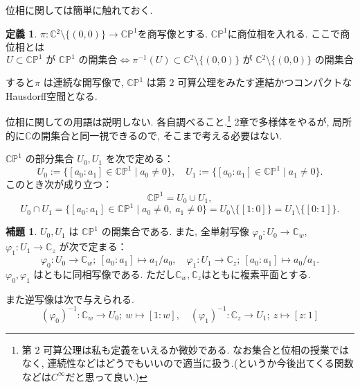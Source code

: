\documentclass[dvipdfmx,a4paper,11pt]{article} %
\newcommand{\C}{\mathbb{C}}
\theoremstyle{definition}
\numberwithin{equation}{section}
\newtheorem{lem}[thm]{補題}
\newtheorem{defn}[thm]{定義}
\begin{document}
位相に関しては簡単に触れておく. 

\begin{defn}
$\pi  : \C{}^2\setminus \{(0,0)\} \to \C\mathbb P^1$を商写像とする. 
$ \C\mathbb P^1$に商位相を入れる. 
ここで商位相とは
\[
U\subset \C\mathbb P^1\text{ が }\C\mathbb P^1\text{ の開集合}
\Longleftrightarrow
\pi^{-1}(U)\subset \C{}^2\setminus \{(0,0)\}\text{ が }\C{}^2\setminus \{(0,0)\}\text{ の開集合}
\]

すると$\pi$ は連続な開写像で, $\C\mathbb P^1$ は第 $2$ 可算公理をみたす連結かつコンパクトなHausdorff空間となる. 
\end{defn}
位相に関しての用語は説明しない. 各自調べること.\footnote{第 $2$ 可算公理は私も定義をいえるか微妙である. なお集合と位相の授業ではなく, 連続性などはどうでもいいので適当に扱う.(というか今後出てくる関数などは$C^\infty$だと思って良い.)} 2章で多様体をやるが, 局所的に$\C$の開集合と同一視できるので, そこまで考える必要はない. 


$\C\mathbb P^1$ の部分集合 $U_0,U_1$ を次で定める：
\[
U_0:=\{[a_0:a_1]\in \C\mathbb P^1\mid a_0\neq 0\},\quad
U_1:=\{[a_0:a_1]\in \C\mathbb P^1\mid a_1\neq 0\}.
\]
このとき次が成り立つ：
\[
\C\mathbb P^1=U_0\cup U_1,
\]
\[
U_0\cap U_1
=
\{[a_0:a_1]\in \C\mathbb P^1\mid a_0\neq 0,\ a_1\neq 0\}
=
U_0\setminus\{[1:0]\}
=
U_1\setminus\{[0:1]\}.
\]

\begin{lem}\label{O-M005}
$U_0,U_1$ は $\C\mathbb P^1$ の開集合である. また, 全単射写像 $\varphi_0:U_0\to \C_w$, $\varphi_1:U_1\to \C_z$ が次で定まる：
\[
\varphi_0:U_0\longrightarrow \C_w;\ [a_0:a_1]\longmapsto a_1/a_0,\quad
\varphi_1:U_1\longrightarrow \C_z;\ [a_0:a_1]\longmapsto a_0/a_1.
\]
$\varphi_0,\varphi_1$ はともに同相写像である.
ただし$\mathbb C_w,\mathbb C_z$はともに複素平面とする. 

また逆写像は次で与えられる.
\[
(\varphi_0)^{-1}:\C_w \longrightarrow U_0 ;\ w\longmapsto [1:w],\quad
(\varphi_1)^{-1}:\C_z\longrightarrow U_1 ;\ z\longmapsto [z:1]
\]
\end{lem}
\end{document}

